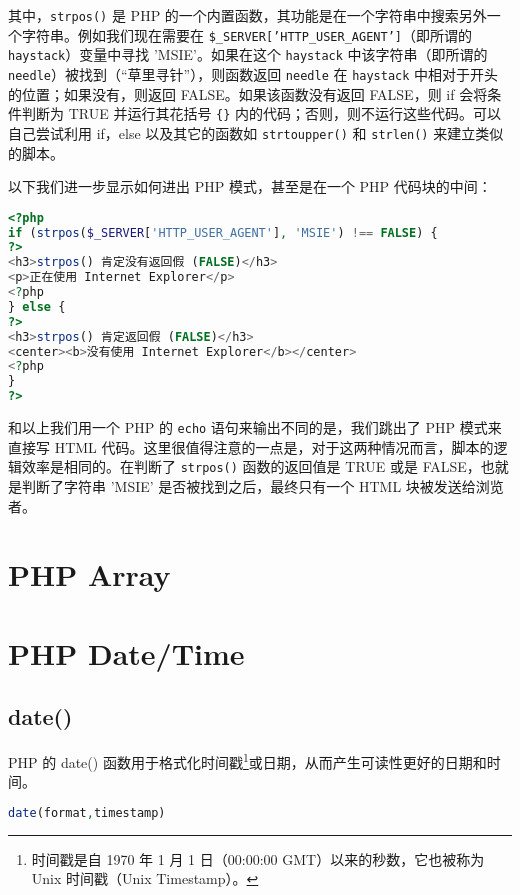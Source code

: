 其中，\texttt{strpos()} 是 PHP 的一个内置函数，其功能是在一个字符串中搜索另外一个字符串。例如我们现在需要在 \texttt{\$\_SERVER['HTTP\_USER\_AGENT']}（即所谓的 \texttt{haystack}）变量中寻找 'MSIE'。如果在这个 \texttt{haystack} 中该字符串（即所谓的 \texttt{needle}）被找到（“草里寻针”），则函数返回 \texttt{needle} 在 \texttt{haystack} 中相对于开头的位置；如果没有，则返回 FALSE。如果该函数没有返回 FALSE，则 if 会将条件判断为 TRUE 并运行其花括号 \texttt{\{\}} 内的代码；否则，则不运行这些代码。可以自己尝试利用 if，else 以及其它的函数如 \texttt{strtoupper()} 和 \texttt{strlen()} 来建立类似的脚本。


以下我们进一步显示如何进出 PHP 模式，甚至是在一个 PHP 代码块的中间：


\begin{lstlisting}[language=PHP]
<?php
if (strpos($_SERVER['HTTP_USER_AGENT'], 'MSIE') !== FALSE) {
?>
<h3>strpos() 肯定没有返回假 (FALSE)</h3>
<p>正在使用 Internet Explorer</p>
<?php
} else {
?>
<h3>strpos() 肯定返回假 (FALSE)</h3>
<center><b>没有使用 Internet Explorer</b></center>
<?php
}
?>
\end{lstlisting}

和以上我们用一个 PHP 的 \texttt{echo} 语句来输出不同的是，我们跳出了 PHP 模式来直接写 HTML 代码。这里很值得注意的一点是，对于这两种情况而言，脚本的逻辑效率是相同的。在判断了 \texttt{strpos()} 函数的返回值是 TRUE 或是 FALSE，也就是判断了字符串 'MSIE' 是否被找到之后，最终只有一个 HTML 块被发送给浏览者。


\chapter{PHP Array}





\chapter{PHP Date/Time}


\section{date()}



PHP 的 date() 函数用于格式化时间戳\footnote{时间戳是自 1970 年 1 月 1 日（00:00:00 GMT）以来的秒数，它也被称为 Unix 时间戳（Unix Timestamp）。}或日期，从而产生可读性更好的日期和时间。

\begin{lstlisting}[language=PHP]
     date(format,timestamp)
\end{lstlisting}

